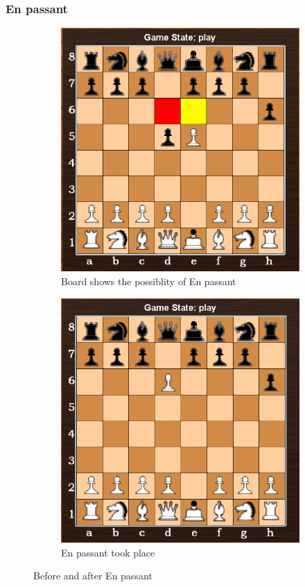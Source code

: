 \documentclass[11pt,a4paper]{article}
\begin{document}
\subsubsection{En passant}
\begin{figure}[H]
\centering
\begin{subfigure}{0.5\textwidth}
  \centering
  \includegraphics[width=0.91\linewidth]{Enpassant1}
  \caption{Board shows the possiblity of En passant}
  \label{fig:sub1}
\end{subfigure}%
\begin{subfigure}{0.5\textwidth}
  \centering
  \includegraphics[width=0.9\linewidth]{Enpassant2}
  \caption{En passant took place}
  \label{fig:sub2}
\end{subfigure}
\caption{Before and after En passant}
\label{fig:test}
\end{figure}
\end{document}
